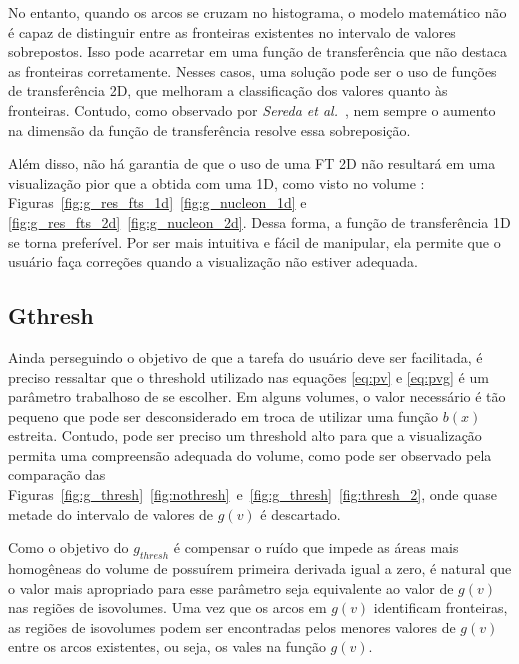 	No entanto, quando os arcos se cruzam no histograma, o modelo matemático não é capaz de distinguir entre as fronteiras existentes no intervalo de valores sobrepostos. Isso pode acarretar em uma função de transferência que não destaca as fronteiras corretamente. Nesses casos, uma solução pode ser o uso de funções de transferência 2D, que melhoram a classificação dos valores quanto às fronteiras. Contudo, como observado por \textit{Sereda et al.}~\cite{sereda1}, nem sempre o aumento na dimensão da função de transferência resolve essa sobreposição.
	
	Além disso, não há garantia de que o uso de uma FT 2D não resultará em uma visualização pior que a obtida com uma 1D, como visto no volume : Figuras~\ref{fig:g_res_fts_1d}~\ref{fig:g_nucleon_1d} e \ref{fig:g_res_fts_2d}~\ref{fig:g_nucleon_2d}. Dessa forma, a função de transferência 1D se torna preferível. Por ser mais intuitiva e fácil de manipular, ela permite que o usuário faça correções quando a visualização não estiver adequada.
	
\subsection{Gthresh}
	Ainda perseguindo o objetivo de que a tarefa do usuário deve ser facilitada, é preciso ressaltar que o threshold utilizado nas equações \eqref{eq:pv} e \eqref{eq:pvg} é um parâmetro trabalhoso de se escolher. Em alguns volumes, o valor necessário é tão pequeno que pode ser desconsiderado em troca de utilizar uma função $ b(x) $ estreita. Contudo, pode ser preciso um threshold alto para que a visualização permita uma compreensão adequada do volume, como pode ser observado pela comparação das Figuras~\ref{fig:g_thresh}~\ref{fig:nothresh}~e~\ref{fig:g_thresh}~\ref{fig:thresh_2}, onde quase metade do intervalo de valores de $ g(v) $ é descartado.
	
	Como o objetivo do $ g_{thresh} $ é compensar o ruído que impede as áreas mais homogêneas do volume de possuírem primeira derivada igual a zero, é natural que o valor mais apropriado para esse parâmetro seja equivalente ao valor de $ g(v) $ nas regiões de isovolumes. Uma vez que os arcos em $ g(v) $ identificam fronteiras, as regiões de isovolumes podem ser encontradas pelos menores valores de $ g(v) $ entre os arcos existentes, ou seja, os vales na função $ g(v) $.
	
